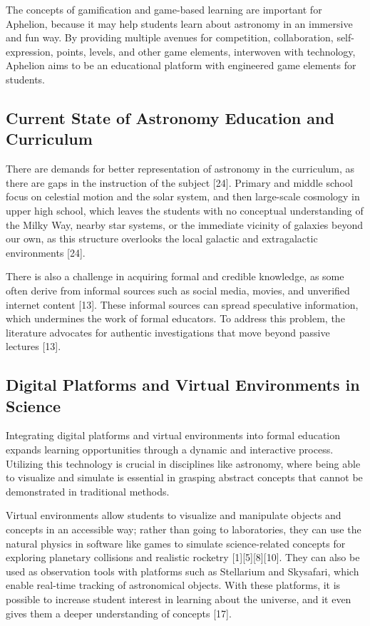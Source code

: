 The concepts of gamification and game-based learning are important for Aphelion, because it may help students learn about astronomy in 
an immersive and fun way. By providing multiple avenues for competition, collaboration, self-expression, points, levels, and other game 
elements, interwoven with technology, Aphelion aims to be an educational platform with engineered game elements for students.

\subsection{Current State of Astronomy Education and Curriculum}

There are demands for better representation of astronomy in the curriculum, as there are gaps in the instruction of the subject 
[24]. Primary and middle school focus on celestial motion and the solar system, and then large-scale cosmology in upper high school,
which leaves the students with no conceptual understanding of the Milky Way, nearby star systems, or the immediate vicinity of galaxies 
beyond our own, as this structure overlooks the local galactic and extragalactic environments [24].

There is also a challenge in acquiring formal and credible knowledge, as some often derive from informal sources such as social media, 
movies, and unverified internet content [13]. These informal sources can spread speculative information, which undermines the work of 
formal educators. To address this problem, the literature advocates for authentic investigations that move beyond passive lectures [13]. 

\subsection{Digital Platforms and Virtual Environments in Science}

Integrating digital platforms and virtual environments into formal education expands learning opportunities through a dynamic 
and interactive process. Utilizing this technology is crucial in disciplines like astronomy, where being able to visualize and 
simulate is essential in grasping abstract concepts that cannot be demonstrated in traditional methods.

Virtual environments allow students to visualize and manipulate objects and concepts in an accessible way; rather than going to 
laboratories, they can use the natural physics in software like games to simulate science-related concepts for exploring planetary 
collisions and realistic rocketry [1][5][8][10]. They can also be used as observation tools with platforms such as Stellarium and 
Skysafari, which enable real-time tracking of astronomical objects. With these platforms, it is possible to increase student interest 
in learning about the universe, and it even gives them a deeper understanding of concepts [17].

